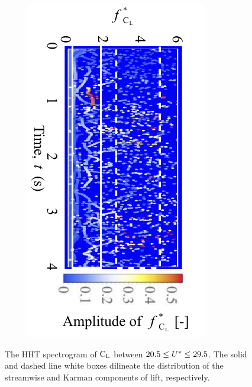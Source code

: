 \documentclass[oneside]{utmthesis}
\begin{document}
\begin{figure}[H]
\begin{subfigure}[h]{0.49\textwidth}
    \includegraphics[angle=90,width=\textwidth]{figs/instantLiftFreq-e}
    \caption{}
    \label{fig:instantLiftFreq-e}
  \end{subfigure}
  \caption{The HHT spectrogram of $\text{C}_{\text{L}}$ between $20.5 \leq U^{*} \leq 29.5$. The solid and dashed line white boxes dilineate the distribution of the streamwise and Karman components of lift, respectively.}
  \label{fig:instantLiftFreq}
\end{figure}
\end{document}
